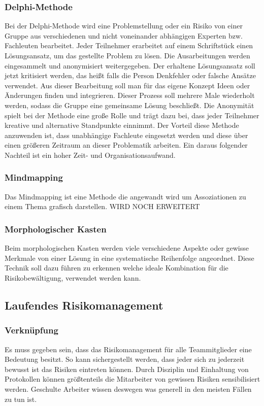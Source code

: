 \subsubsection{Delphi-Methode}
Bei der Delphi-Methode wird eine Problemstellung oder ein Risiko von einer Gruppe aus verschiedenen und nicht voneinander abhängigen Experten bzw. Fachleuten bearbeitet. 
Jeder Teilnehmer erarbeitet auf einem Schriftstück einen Lösungsansatz, um das gestellte Problem zu lösen.
Die Ausarbeitungen werden eingesammelt und anonymisiert weitergegeben.
Der erhaltene Lösungsansatz soll jetzt kritisiert werden, das heißt falls die Person Denkfehler oder falsche Ansätze verwendet. Aus dieser Bearbeitung soll man für das eigene Konzept Ideen oder Änderungen finden und integrieren.
Dieser Prozess soll mehrere Male wiederholt werden, sodass die Gruppe eine gemeinsame Lösung beschließt.
Die Anonymität spielt bei der Methode eine große Rolle und trägt dazu bei, dass jeder Teilnehmer kreative und alternative Standpunkte einnimmt.
Der Vorteil diese Methode anzuwenden ist, dass unabhängige Fachleute eingesetzt werden und diese über einen größeren Zeitraum an dieser Problematik arbeiten.
Ein daraus folgender Nachteil ist ein hoher Zeit- und Organisationsaufwand.


\subsubsection{Mindmapping}
Das Mindmapping ist eine Methode die angewandt wird um Assoziationen zu einem Thema grafisch darstellen.
WIRD NOCH ERWEITERT

\subsubsection{Morphologischer Kasten}
Beim morphologischen Kasten werden viele verschiedene Aspekte oder gewisse Merkmale von einer Lösung in eine systematische Reihenfolge angeordnet. Diese Technik soll dazu führen zu erkennen welche ideale Kombination für die Risikobewältigung, verwendet werden kann.

\subsection{Laufendes Risikomanagement}
\subsubsection{Verknüpfung}
Es muss gegeben sein, dass das Risikomanagement für alle Teammitglieder eine Bedeutung besitzt. So kann sichergestellt werden, dass jeder sich zu jederzeit bewusst ist das Risiken eintreten können. Durch Disziplin und Einhaltung von Protokollen können größtenteils die Mitarbeiter von gewissen Risiken sensibilisiert werden. Geschulte Arbeiter wissen deswegen was generell in den meisten Fällen zu tun ist.

